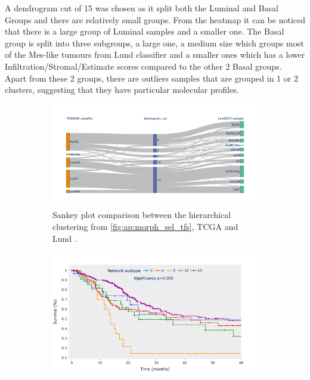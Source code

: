 A dendrogram cut of 15 was chosen as it split both the Luminal and Basal Groups and there are relatively small groups. From the heatmap it can be noticed that there is a large group of Luminal samples and a smaller one. The Basal group is split into three subgroups, a large one, a medium size which groups most of the Mes-like tumours from Lund classifier and a smaller ones which has a lower Infiltration/Stromal/Estimate scores compared to the other 2 Basal groups. Apart from these 2 groups, there are outliers samples that are grouped in 1 or 2 clusters, suggesting that they have particular molecular profiles.

\begin{figure}[!h]
    \captionsetup[subfigure]{justification=Centering}
\begin{subfigure}[!t]{0.5\textwidth}
    \includegraphics[width=1.0\textwidth,height=1.0\textheight,keepaspectratio]{Sections/Network_I/Resources/selective_pruning/sankey_sel_tfs.png}
    
    \caption{Sankey plot comparison between the hierarchical clustering from \cref{fig:ap:morph_sel_tfs}, TCGA \cite{Robertson2017-mg} and Lund \cite{Marzouka2018-ge}.}
    
    \label{fig:N_I:sankey_sel_tfs}
\end{subfigure}\hspace{\fill} %
\begin{subfigure}[!t]{0.5\textwidth}
    \includegraphics[width=1.0\textwidth,height=1.0\textheight,keepaspectratio]{Sections/Network_I/Resources/selective_pruning/survival_sel_tfs_cs.png}
    

\end{subfigure}
\end{figure}
